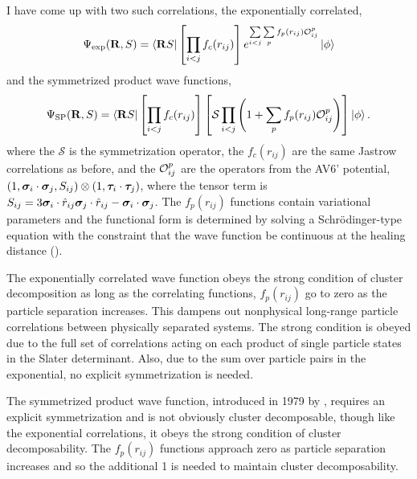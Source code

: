 I have come up with two such correlations, the exponentially correlated,
\begin{equation}
   \Psi_{\text{exp}}(\mathbf{R}, S) = \left< \mathbf{R} S \right|\left[\prod\limits_{i<j}f_c(r_{ij})\right] e^{\sum\limits_{i<j}\sum\limits_{p}f_p(r_{ij})\mathcal{O}_{ij}^p}\left| \phi \right>
   \label{equ:exppsi}
\end{equation}
and the symmetrized product wave functions,
\begin{equation}
   \Psi_{\text{SP}}(\mathbf{R}, S) = \left< \mathbf{R} S \right|\left[\prod\limits_{i<j}f_c(r_{ij})\right] \left[\mathcal{S}\prod\limits_{i<j}\left(1+\sum\limits_pf_p(r_{ij})\mathcal{O}_{ij}^p\right)\right] \left| \phi \right>.
   \label{equ:prodpsi}
\end{equation}
where the $\mathcal{S}$ is the symmetrization operator, the $f_c(r_{ij})$ are the same Jastrow correlations as before, and the $\mathcal{O}_{ij}^p$ are the operators from the AV6' potential, $(1,\bm{\sigma}_i\cdot\bm{\sigma}_j,S_{ij})\otimes(1,\bm{\tau}_i\cdot\bm{\tau}_j)$, where the tensor term is $S_{ij} = 3\bm{\sigma}_i\cdot\hat{r}_{ij}\bm{\sigma}_j\cdot\hat{r}_{ij}-\bm{\sigma}_i\cdot\bm{\sigma}_j$. The $f_p(r_{ij})$ functions contain variational parameters and the functional form is determined by solving a Schr\"odinger-type equation with the constraint that the wave function be continuous at the healing distance (\cite{pandharipande1979,pandharipande1977}).

The exponentially correlated wave function obeys the strong condition of cluster decomposition as long as the correlating functions, $f_p(r_{ij})$ go to zero as the particle separation increases. This dampens out nonphysical long-range particle correlations between physically separated systems. The strong condition is obeyed due to the full set of correlations acting on each product of single particle states in the Slater determinant. Also, due to the sum over particle pairs in the exponential, no explicit symmetrization is needed.

The symmetrized product wave function, introduced in 1979 by \cite{pandharipande1979}, requires an explicit symmetrization and is not obviously cluster decomposable, though like the exponential correlations, it obeys the strong condition of cluster decomposability. The $f_p(r_{ij})$ functions approach zero as particle separation increases and so the additional 1 is needed to maintain cluster decomposability.

